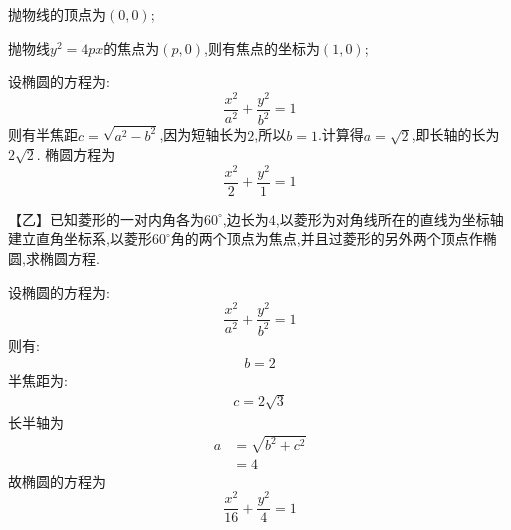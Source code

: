 \begin{questions}
\begin{solution}
		\begin{cenum}
			\item 抛物线的顶点为$(0,0)$;
			\item 抛物线$y^2=4px$的焦点为$(p,0)$,则有焦点的坐标为$(1,0)$;
			\item 设椭圆的方程为:
			      \begin{equation*}
				      \frac{x^2}{a^2} + \frac{y^2}{b^2} = 1
			      \end{equation*}
			      则有半焦距$c=\sqrt{a^2-b^2}$,因为短轴长为$2$,所以$b=1$.计算得$a=\sqrt{2}$,即长轴的长为$2\sqrt{2}$.
			      椭圆方程为
			      \begin{equation*}
				      \frac{x^2}{2} + \frac{y^2}{1} = 1
			      \end{equation*}
		\end{cenum}
	\end{solution}

	【乙】已知菱形的一对内角各为$60^\circ$,边长为$4$,以菱形为对角线所在的直线为坐标轴建立直角坐标系,以菱形$60^\circ$角的两个顶点为焦点,并且过菱形的另外两个顶点作椭圆,求椭圆方程.
	\begin{center}
	\end{center}
	\begin{solution}

		设椭圆的方程为:
		\begin{equation*}
			\frac{x^2}{a^2} + \frac{y^2}{b^2} = 1
		\end{equation*}
		则有:
		\begin{align*}
			b = 2
		\end{align*}
		半焦距为:
		\begin{align*}
			c = 2\sqrt{3}
		\end{align*}
		长半轴为
		\begin{align*}
			a & = \sqrt{b^2 + c^2} \\
			  & = 4
		\end{align*}
		故椭圆的方程为
		\begin{equation*}
			\frac{x^2}{16} + \frac{y^2}{4} = 1
		\end{equation*}
	\end{solution}


\end{questions}

